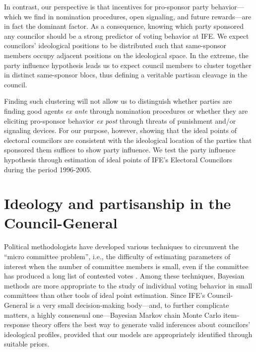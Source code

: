 \documentclass[12 pt, letter]{article}
\begin{document}
In contrast, our perspective is that incentives for pro-sponsor
party behavior---which we find in nomination procedures, open
signaling, and future rewards---are in fact the dominant factor.  As
a consequence, knowing which party sponsored any councilor should be
a strong predictor of voting behavior at IFE. We expect councilors'
ideological positions to be distributed such that same-sponsor
members occupy adjacent positions on the ideological space. In the
extreme, the party influence hypothesis leads us to expect council
members to cluster together in distinct same-sponsor blocs, thus
defining a veritable partisan cleavage in the council.

Finding such clustering will not allow us to distinguish whether
parties are finding good agents \emph{ex ante} through nomination
procedures or whether they are eliciting pro-sponsor behavior
\emph{ex post} through threats of punishment and/or signaling
devices.  For our purpose, however, showing that the ideal points of
electoral councilors are consistent with the ideological location of
the parties that sponsored them suffices to show party influence. We
test the party influence hypothesis through estimation of ideal
points of IFE's Electoral Councilors during the period 1996-2005.

\singlespacing

\section{Ideology and partisanship in the Council-General}\label{S:estimation}

\doublespacing Political methodologists have developed various
techniques to circumvent the ``micro committee problem'', i.e., the
difficulty of estimating parameters of interest when the number of
committee members is small, even if the committee has produced a
long list of contested votes \citep{Londregan2000}.  Among these
techniques, Bayesian methods \citep{Martin2002, Clinton2004,
Jackman2001} are more appropriate to the study of individual voting
behavior in small committees than other tools of ideal point
estimation.  Since IFE's Council-General is a very small
decision-making body---and, to further complicate matters, a highly
consensual one---Bayesian Markov chain Monte Carlo item-response
theory  offers the best way to generate valid inferences about
councilors' ideological profiles, provided that our models are
appropriately identified through suitable priors.
\end{document}
